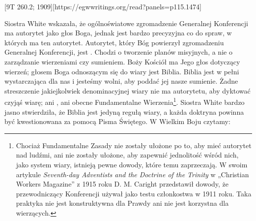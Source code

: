 [9T 260.2; 1909][https://egwwritings.org/read?panels=p115.1474]

Siostra White wskazała, że ogólnoświatowe zgromadzenie Generalnej Konferencji ma autorytet jako głos Boga, jednak jest bardzo precyzyjna co do spraw, w których ma ten autorytet. Autorytet, który Bóg powierzył zgromadzeniu Generalnej Konferencji, jest . Chodzi o tworzenie planów misyjnych, a nie o zarządzanie wierzeniami czy sumieniem. Boży Kościół ma Jego głos dotyczący wierzeń; głosem Boga odnoszącym się do wiary jest Biblia. Biblia jest w pełni wystarczająca dla nas i jesteśmy wolni, aby poddać jej nasze sumienie. Żadne streszczenie jakiejkolwiek denominacyjnej wiary nie ma autorytetu, aby dyktować czyjąś wiarę; ani , ani obecne Fundamentalne Wierzenia\footnote{Chociaż Fundamentalne Zasady nie zostały ułożone po to, aby mieć autorytet nad ludźmi, ani nie zostały ułożone, aby zapewnić jednolitość wśród nich, jako system wiary, istnieją pewne dowody, które temu zaprzeczają. W swoim artykule \textit{Seventh-day Adventists and the Doctrine of the Trinity} w „Christian Workers Magazine” z 1915 roku D. M. Caright przedstawił dowody, że przewodniczący Konferencji używał  jako testu członkostwa w 1911 roku. Taka praktyka nie jest konstruktywna dla Prawdy ani nie jest korzystna dla wierzących.}. Siostra White bardzo jasno stwierdziła, że Biblia jest jedyną regułą wiary, a każda doktryna powinna być kwestionowana za pomocą Pisma Świętego. W Wielkim Boju czytamy:

